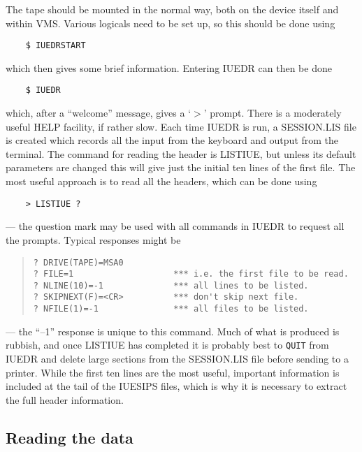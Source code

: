 The tape should be mounted in the normal way, both on the device itself and 
within VMS. Various logicals need to be set up, so this should be done using
\begin{verbatim}
    $ IUEDRSTART
\end{verbatim}
which then gives some brief information. Entering IUEDR can then be done
\begin{verbatim}
    $ IUEDR
\end{verbatim}
which, after a ``welcome'' message, gives a `$>$' prompt. There is a moderately
useful HELP facility, if rather slow. Each time IUEDR is run, a SESSION.LIS
file is created which records all the input from the keyboard and output from 
the terminal. The command for reading the header is
LISTIUE, but unless its default parameters are changed this 
will give just the initial ten lines of the first file. The most useful
approach is to read all the headers, which can be done using 
\begin{verbatim}
    > LISTIUE ?
\end{verbatim}
--- the question mark may be used with all commands in IUEDR to request all the 
prompts. Typical responses might be 
\begin{quote}
\begin{verbatim}
? DRIVE(TAPE)=MSA0
? FILE=1                    *** i.e. the first file to be read.
? NLINE(10)=-1              *** all lines to be listed.
? SKIPNEXT(F)=<CR>          *** don't skip next file.
? NFILE(1)=-1               *** all files to be listed.
\end{verbatim}
\end{quote}
--- the ``--1'' response is unique to this command. Much of what is produced is
rubbish, and once LISTIUE has completed it is probably best
to {\tt QUIT} from IUEDR and delete large sections from the 
SESSION.LIS file before sending to a printer. While the first ten lines are
the most useful, important information is included at the tail of the IUESIPS
files, which is why it is necessary to extract the full header information. 

\subsection{Reading the data}

